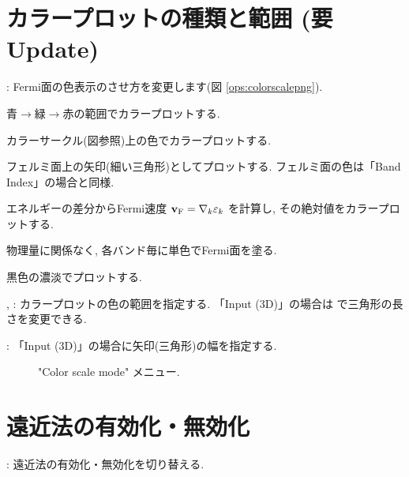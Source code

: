 \documentclass[letterpaper,10pt,dvipdfmx,openany]{sphinxmanual}
\let\sphinxpxdimen\pdfpxdimen\else\newdimen\sphinxpxdimen
\begin{document}
\section{カラープロットの種類と範囲 (要Update)}
\label{\detokenize{ops:update}}
\sphinxAtStartPar
{} : Fermi面の色表示のさせ方を変更します(図 \ref{ops:colorscalepng}).
\begin{description}
\sphinxAtStartPar
青\(\rightarrow\)緑\(\rightarrow\)赤の範囲でカラープロットする.

\sphinxAtStartPar
カラーサークル(図参照)上の色でカラープロットする.

\sphinxAtStartPar
フェルミ面上の矢印(細い三角形)としてプロットする.
フェルミ面の色は「Band Index」の場合と同様.

\sphinxAtStartPar
エネルギーの差分からFermi速度 \({\bf v}_{\rm F} = \nabla_k \varepsilon_k\)
を計算し, その絶対値をカラープロットする.

\sphinxAtStartPar
物理量に関係なく, 各バンド毎に単色でFermi面を塗る.

\sphinxAtStartPar
黒色の濃淡でプロットする.

\end{description}

\sphinxAtStartPar
{},  : カラープロットの色の範囲を指定する.
「Input (3D)」の場合は  で三角形の長さを変更できる.

\sphinxAtStartPar
{} : 「Input (3D)」の場合に矢印(三角形)の幅を指定する.

\begin{figure}[htbp]
\centering
\capstart

\noindent\sphinxincludegraphics[width=700\sphinxpxdimen]{{colorscale}.png}
\caption{"Color scale mode" メニュー.}\label{\detokenize{ops:id27}}\label{\detokenize{ops:colorscalepng}}\end{figure}


\section{遠近法の有効化・無効化}
\label{\detokenize{ops:id9}}
\sphinxAtStartPar
{} : 遠近法の有効化・無効化を切り替える.
\end{document}
